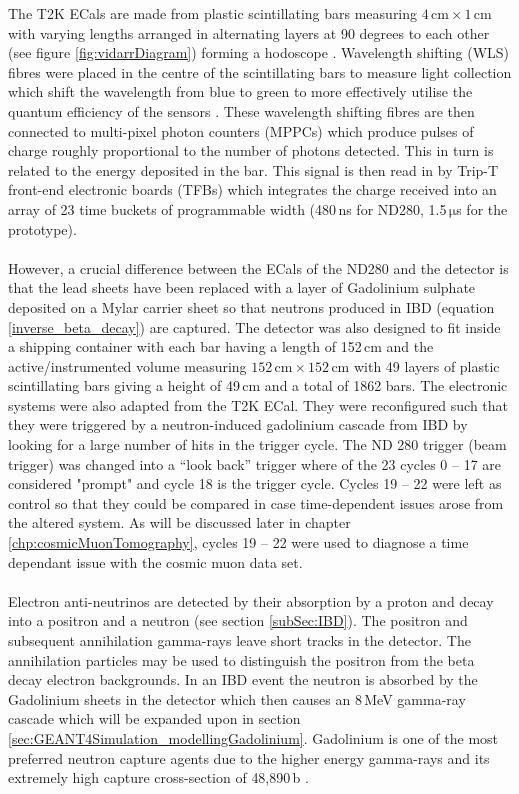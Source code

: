 The T2K ECals are made from plastic scintillating bars measuring $4\,\textrm{cm}\times1\,\textrm{cm}$ with varying lengths arranged in alternating layers at 90 degrees to each other (see figure \ref{fig:vidarrDiagram}) forming a hodoscope \cite{Allan_2013}. Wavelength shifting (WLS) fibres were placed in the centre of the scintillating bars to measure light collection which shift the wavelength from blue to green to more effectively utilise the quantum efficiency of the sensors \cite{Allan_2013}. These wavelength shifting fibres are then connected to multi-pixel photon counters (MPPCs) which produce pulses of charge roughly proportional to the number of photons detected. This in turn is related to the energy deposited in the bar. This signal is then read in by Trip-T front-end electronic boards (TFBs) which integrates the charge received into an array of 23 time buckets of programmable width (480\,ns for ND280, 1.5\,$\mathrm{\mu}$s for the prototype). 
\\\\However, a crucial difference between the ECals of the ND280 and the detector is that the lead sheets have been replaced with a layer of Gadolinium sulphate deposited on a Mylar carrier sheet so that neutrons produced in IBD (equation \ref{inverse_beta_decay}) are captured. The detector was also designed to fit inside a shipping container with each bar having a length of 152\,cm and the active/instrumented volume measuring $152\,\textrm{cm}\times152\,\textrm{cm}$ with 49 layers of plastic scintillating bars giving a height of 49\,cm and a total of 1862 bars. The electronic systems were also adapted from the T2K ECal. They were reconfigured such that they were triggered by a neutron-induced gadolinium cascade from IBD by looking for a large number of hits in the trigger cycle. The ND 280 trigger (beam trigger) was changed into a ``look back'' trigger where of the 23 cycles 0 -- 17 are considered "prompt" and cycle 18 is the trigger cycle. Cycles 19 -- 22 were left as control so that they could be compared in case time-dependent issues arose from the altered system. As will be discussed later in chapter \ref{chp:cosmicMuonTomography}, cycles 19 -- 22 were used to diagnose a time dependant issue with the cosmic muon data set.
\\\\Electron anti-neutrinos  are detected by their absorption by a proton and decay into a positron and a neutron (see section \ref{subSec:IBD}). The positron and subsequent annihilation gamma-rays leave short tracks in the detector. The annihilation particles may be used to distinguish the positron from the beta decay electron backgrounds. In an IBD event the neutron is absorbed by the Gadolinium sheets in the detector which then causes an 8\,MeV gamma-ray cascade which will be expanded upon in section \ref{sec:GEANT4Simulation_modellingGadolinium}. Gadolinium is one of the most preferred neutron capture agents due to the higher energy gamma-rays and its extremely high capture cross-section of 48,890\,b \cite{Abdushukurov_2010}. 

